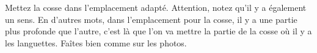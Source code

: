 \documentclass{article}
\begin{document}
\begin{minipage}{\textwidth}
    \vspace{0.5cm}
    \begin{center}
    \captionsetup{labelformat=empty}
    \end{center}
    \vspace{0.5cm}
\end{minipage}

Mettez la cosse dans l'emplacement adapté. Attention, notez qu'il y a également un sens. En d'autres mots, dans l'emplacement pour la cosse, il y a une partie plus profonde que l'autre, c'est là que l'on va mettre la partie de la cosse où il y a les languettes. Faîtes bien comme sur les photos.  
\end{document}
